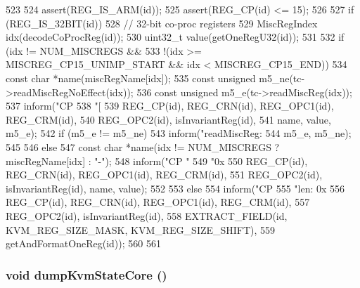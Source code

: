\begin{DoxyCode}
523 {
524     assert(REG_IS_ARM(id));
525     assert(REG_CP(id) <= 15);
526 
527     if (REG_IS_32BIT(id)) {
528         // 32-bit co-proc registers
529         MiscRegIndex idx(decodeCoProcReg(id));
530         uint32_t value(getOneRegU32(id));
531 
532         if (idx != NUM_MISCREGS &&
533             !(idx >= MISCREG_CP15_UNIMP_START && idx < MISCREG_CP15_END)) {
534             const char *name(miscRegName[idx]);
535             const unsigned m5_ne(tc->readMiscRegNoEffect(idx));
536             const unsigned m5_e(tc->readMiscReg(idx));
537             inform("CP%
538                    "[%
539                    REG_CP(id), REG_CRN(id), REG_OPC1(id), REG_CRM(id),
540                    REG_OPC2(id), isInvariantReg(id),
541                    name, value, m5_e);
542             if (m5_e != m5_ne) {
543                 inform("readMiscReg: %
544                        m5_e, m5_ne);
545             }
546         } else {
547             const char *name(idx != NUM_MISCREGS ? miscRegName[idx] : "-");
548             inform("CP%
      "
549                    "0x%
550                    REG_CP(id), REG_CRN(id), REG_OPC1(id), REG_CRM(id),
551                    REG_OPC2(id), isInvariantReg(id), name, value);
552         }
553     } else {
554         inform("CP%
555                "len: 0x%
556                REG_CP(id), REG_CRN(id), REG_OPC1(id), REG_CRM(id),
557                REG_OPC2(id), isInvariantReg(id),
558                EXTRACT_FIELD(id, KVM_REG_SIZE_MASK, KVM_REG_SIZE_SHIFT),
559                getAndFormatOneReg(id));
560     }
561 }
\end{DoxyCode}
\hypertarget{classArmKvmCPU_a54d58f77f2887428772599f7ddd8652e}{
\subsubsection[{dumpKvmStateCore}]{\setlength{\rightskip}{0pt plus 5cm}void dumpKvmStateCore ()}}
\label{classArmKvmCPU_a54d58f77f2887428772599f7ddd8652e}



